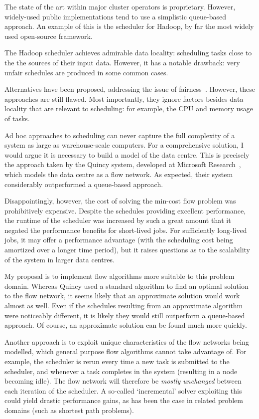 The state of the art within major cluster operators is proprietary. However, widely-used public implementations tend to use a simplistic queue-based approach. An example of this is the scheduler for Hadoop, by far the most widely used open-source framework.

The Hadoop scheduler achieves admirable data locality: scheduling tasks close to the the sources of their input data. However, it has a notable drawback: very unfair schedules are produced in some common cases.

Alternatives have been proposed, addressing the issue of fairness~\cite{Zaharia:2010}. However, these approaches are still flawed. Most importantly, they ignore factors besides data locality that are relevant to scheduling: for example, the CPU and memory usage of tasks.

Ad hoc approaches to scheduling can never capture the full complexity of a system as large as warehouse-scale computers. For a comprehensive solution, I would argue it is necessary to build a model of the data centre. This is precisely the approach taken by the Quincy system, developed at Microsoft Research~\cite{Isard:2009}, which models the data centre as a flow network. As expected, their system considerably outperformed a queue-based approach.

Disappointingly, however, the cost of solving the min-cost flow problem was prohibitively expensive. Despite the schedules providing excellent performance, the runtime of the scheduler was increased by such a great amount that it negated the performance benefits for short-lived jobs. For sufficiently long-lived jobs, it may offer a performance advantage (with the scheduling cost being amortized over a longer time period), but it raises questions as to the scalability of the system in larger data centres.

My proposal is to implement flow algorithms more suitable to this problem domain. Whereas Quincy used a standard algorithm to find an optimal solution to the flow network, it seems likely that an approximate solution would work almost as well. Even if the schedules resulting from an approximate algorithm were noticeably different, it is likely they would still outperform a queue-based approach. Of course, an approximate solution can be found much more quickly.

Another approach is to exploit unique characteristics of the flow networks being modelled, which general purpose flow algorithms cannot take advantage of. For example, the scheduler is rerun every time a new task is submitted to the scheduler, and whenever a task completes in the system (resulting in a node becoming idle). The flow network will therefore be \emph{mostly unchanged} between each iteration of the scheduler. A so-called `incremental' solver exploiting this could yield drastic performance gains, as has been the case in related problem domains (such as shortest path problems). 

